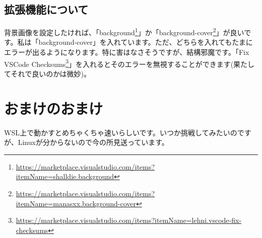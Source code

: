 \subsection{拡張機能について}
背景画像を設定したければ、「background\footnote{\url{https://marketplace.visualstudio.com/items?itemName=shalldie.background}}」か「background-cover\footnote{\url{https://marketplace.visualstudio.com/items?itemName=manasxx.background-cover}}」が良いです。私は「background-cover」を入れています。ただ、どちらを入れてもたまにエラーが出るようになります。特に害はなさそうですが、結構邪魔です。「Fix VSCode Checksums\footnote{\url{https://marketplace.visualstudio.com/items?itemName=lehni.vscode-fix-checksums}}」を入れるとそのエラーを無視することができます(果たしてそれで良いのかは微妙)。

\section{おまけのおまけ}
WSL上で動かすとめちゃくちゃ速いらしいです。いつか挑戦してみたいのですが、Linuxが分からないので今の所見送っています。




